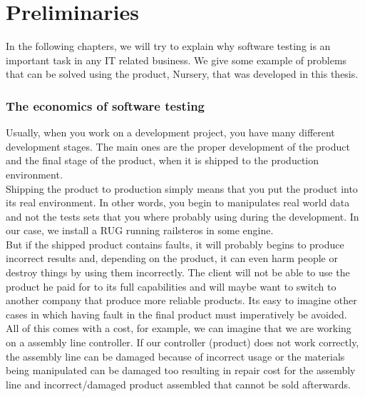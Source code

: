 \documentclass[12pt]{article}
\theoremstyle{definition}
\theoremstyle{definition}
\theoremstyle{remark}
\begin{document}
\clearpage
\part{Preliminaries}

In the following chapters, we will try to explain why software testing is an important task in any IT related business. We give some example of problems that can be solved using the product, Nursery, that was developed in this thesis.



\section{The economics of software testing}


Usually, when you work on a development project, you have many different development stages. The main ones are the proper development of the product and the final stage of the product, when it is shipped to the production environment.\\

Shipping the product to production simply means that you put the product into its real environment. In other words, you begin to manipulates real world data and not the tests sets that you where probably using during the development. In our case, we install a RUG running \gls{railsteros} in some engine.\\

But if the shipped product contains faults, it will probably begins to produce incorrect results and, depending on the product, it can even harm people or destroy things by using them incorrectly. The client will not be able to use the product he paid for to its full capabilities and will maybe want to switch to another company that produce more reliable products. Its easy to imagine other cases in which having fault in the final product must imperatively be avoided.\\

All of this comes with a cost, for example, we can imagine that we are working on a assembly line controller. If our controller (product) does not work correctly, the assembly line can be damaged because of incorrect usage or the materials being manipulated can be damaged too resulting in repair cost for the assembly line and incorrect/damaged product assembled that cannot be sold afterwards.\\
\end{document}
